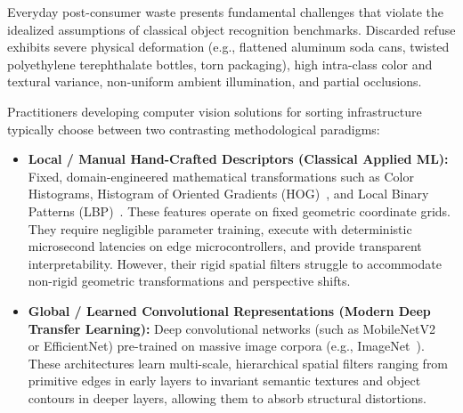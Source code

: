 \documentclass[11pt,a4paper]{article}
\begin{document}
Everyday post-consumer waste presents fundamental challenges that violate the idealized assumptions of classical object recognition benchmarks. Discarded refuse exhibits severe physical deformation (e.g., flattened aluminum soda cans, twisted polyethylene terephthalate bottles, torn packaging), high intra-class color and textural variance, non-uniform ambient illumination, and partial occlusions.

Practitioners developing computer vision solutions for sorting infrastructure typically choose between two contrasting methodological paradigms:
\begin{itemize}[leftmargin=*]
    \item \textbf{Local / Manual Hand-Crafted Descriptors (Classical Applied ML):} Fixed, domain-engineered mathematical transformations such as Color Histograms, Histogram of Oriented Gradients (HOG)~\cite{dalal2005hog}, and Local Binary Patterns (LBP)~\cite{ojala2002lbp}. These features operate on fixed geometric coordinate grids. They require negligible parameter training, execute with deterministic microsecond latencies on edge microcontrollers, and provide transparent interpretability. However, their rigid spatial filters struggle to accommodate non-rigid geometric transformations and perspective shifts.
    \item \textbf{Global / Learned Convolutional Representations (Modern Deep Transfer Learning):} Deep convolutional networks (such as MobileNetV2~\cite{sandler2018mobilenetv2} or EfficientNet) pre-trained on massive image corpora (e.g., ImageNet~\cite{deng2009imagenet}). These architectures learn multi-scale, hierarchical spatial filters ranging from primitive edges in early layers to invariant semantic textures and object contours in deeper layers, allowing them to absorb structural distortions.
\end{itemize}
\end{document}
